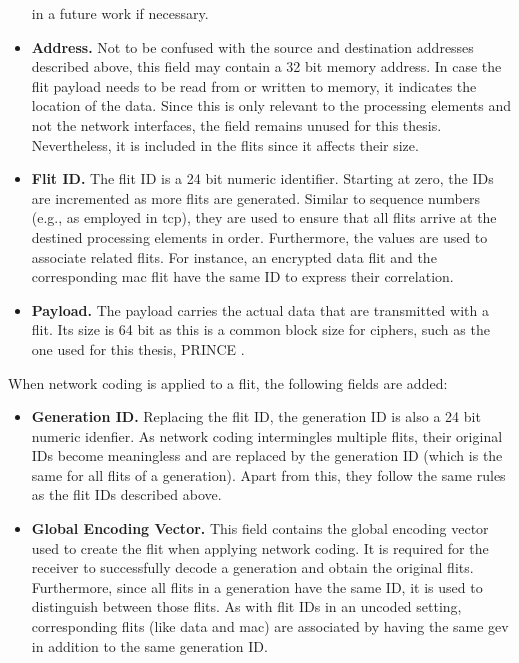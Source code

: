 \begin{itemize}
        in a future work if necessary.
    \item \textbf{Address.} Not to be confused with the source and destination addresses described above, this field may contain a 32 bit memory
        address. In case the flit payload needs to be read from or written to memory, it indicates the location of the data. Since this is only
        relevant to the processing elements and not the network interfaces, the field remains unused for this thesis. Nevertheless, it is included in
        the flits since it affects their size.
    \item \textbf{Flit ID.} The flit ID is a 24 bit numeric identifier. Starting at zero, the IDs are incremented as more flits are generated.
        Similar to sequence numbers (e.g., as employed in \gls{tcp}), they are used to ensure that all flits arrive at the destined processing
        elements in order. Furthermore, the values are used to associate related flits. For instance, an encrypted data flit and the corresponding \gls{mac}
        flit have the same ID to express their correlation.
    \item \textbf{Payload.} The payload carries the actual data that are transmitted with a flit. Its size is 64 bit as this is a common block size
        for ciphers, such as the one used for this thesis, PRINCE \cite{borghoff12prince}.
\end{itemize}
\vspace{0.5\baselineskip}

When network coding is applied to a flit, the following fields are added:
\begin{itemize}
    \item \textbf{Generation ID.} Replacing the flit ID, the generation ID is also a 24 bit numeric idenfier. As network coding intermingles multiple
        flits, their original IDs become meaningless and are replaced by the generation ID (which is the same for all flits of a generation). Apart
        from this, they follow the same rules as the flit IDs described above.
    \item \textbf{Global Encoding Vector.} This field contains the global encoding vector used to create the flit when applying network coding. It is
        required for the receiver to successfully decode a generation and obtain the original flits. Furthermore, since all flits in a generation have
        the same ID, it is used to distinguish between those flits. As with flit IDs in an uncoded setting, corresponding flits (like data and
        \gls{mac}) are associated by having the same \gls{gev} in addition to the same generation ID.
\end{itemize}
\vspace{0.5\baselineskip}

